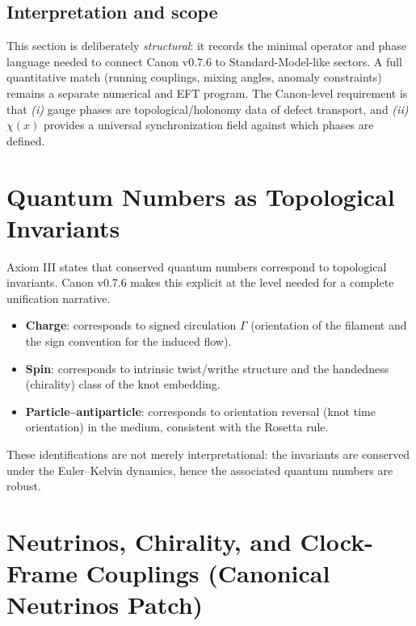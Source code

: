 \documentclass[10pt]{article}
\begin{document}
\subsection{Interpretation and scope}

This section is deliberately \emph{structural}: it records the minimal operator
and phase language needed to connect Canon v0.7.6 to Standard-Model-like sectors.
A full quantitative match (running couplings, mixing angles, anomaly constraints)
remains a separate numerical and EFT program. The Canon-level requirement is that
\emph{(i)} gauge phases are topological/holonomy data of defect transport,
and \emph{(ii)} $\chi(x)$ provides a universal synchronization field against which
phases are defined.


\section{Quantum Numbers as Topological Invariants}
    \label{sec:qn_topology}

    Axiom III states that conserved quantum numbers correspond to topological
    invariants. Canon v0.7.6 makes this explicit at the level needed for a complete
    unification narrative.

    \begin{itemize}
        \item \textbf{Charge}: corresponds to signed circulation $\Gamma$ (orientation
        of the filament and the sign convention for the induced flow).
        \item \textbf{Spin}: corresponds to intrinsic twist/writhe structure and the
        handedness (chirality) class of the knot embedding.
        \item \textbf{Particle--antiparticle}: corresponds to orientation reversal
        (knot time orientation) in the medium, consistent with the Rosetta rule.
    \end{itemize}

    These identifications are not merely interpretational: the invariants are conserved
    under the Euler--Kelvin dynamics, hence the associated quantum numbers are robust.

    \section{Neutrinos, Chirality, and Clock-Frame Couplings (Canonical Neutrinos Patch)}
    \label{sec:neutrinos}
\end{document}
